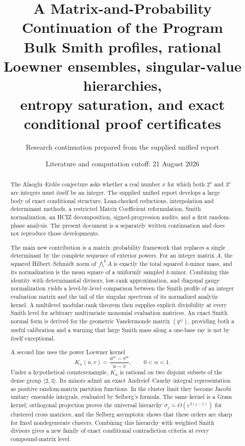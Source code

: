 \documentclass[11pt,oneside]{article}
\title{\textbf{A Matrix-and-Probability Continuation of the \AEconj{} Program}\\[0.4em]
\large Bulk Smith profiles, rational Loewner ensembles, singular-value hierarchies,\\
entropy saturation, and exact conditional proof certificates}
\author{Research continuation prepared from the supplied unified report}
\date{Literature and computation cutoff: 21 August 2026}
\theoremstyle{definition}
\theoremstyle{remark}
\newcommand{\AEconj}{Alaoglu--Erd\H{o}s}
\newcommand{\eps}{\varepsilon}
\begin{document}
\maketitle

\begin{abstract}
The \AEconj{} conjecture asks whether a real number $x$ for which both $2^x$ and $3^x$ are integers must itself be an integer.  The supplied unified report develops a large body of exact conditional structure, Lean-checked reductions, interpolation and determinant methods, a restricted Matrix Coefficient reformulation, Smith normalization, an HCIZ decomposition, signed-progression audits, and a first random-phase analysis.  The present document is a separately written continuation and does not reproduce those developments.

The main new contribution is a matrix--probability framework that replaces a single determinant by the complete sequence of exterior powers.  For an integer matrix $A$, the squared Hilbert--Schmidt norm of $\bigwedge^k A$ is exactly the total squared $k$-minor mass, and its normalization is the mean square of a uniformly sampled $k$-minor.  Combining this identity with determinantal divisors, low-rank approximation, and diagonal gauge normalization yields a level-by-level comparison between the Smith profile of an integer evaluation matrix and the tail of the singular spectrum of its normalized analytic kernel.  A multilevel modular-rank theorem then supplies explicit divisibility at every Smith level for arbitrary multivariate monomial evaluation matrices.  An exact Smith normal form is derived for the geometric Vandermonde matrix $(q^{ij})$, providing both a useful calibration and a warning that large Smith mass along a one-base ray is not by itself exceptional.

A second line uses the power Loewner kernel
\[
 K_\alpha(u,v)=\frac{u^\alpha-v^\alpha}{u-v},\qquad 0<\alpha<1.
\]
Under a hypothetical counterexample, $K_\alpha$ is rational on two disjoint subsets of the dense group $\langle2,3\rangle$.  Its minors admit an exact Andreief--Cauchy integral representation as positive random-matrix partition functions.  In the cluster limit they become Jacobi unitary ensemble integrals, evaluated by Selberg's formula.  The same kernel is a Gram kernel; orthogonal projection proves the universal hierarchy $\sigma_j=O(\eps^{2(j-1)})$ for clustered cross matrices, and the Selberg asymptotic shows that these orders are sharp for fixed nondegenerate clusters.  Combining this hierarchy with weighted Smith divisors gives a new family of exact conditional contradiction criteria at every compound-matrix level.


\end{abstract}
\end{document}
